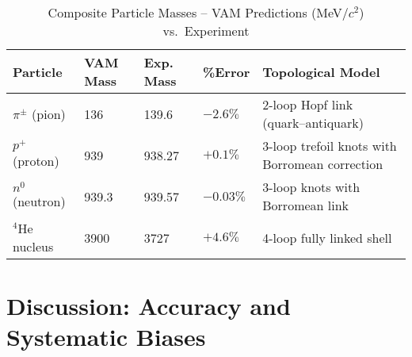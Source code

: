 \begin{table}[h!]
    \centering
    \begin{tabular}{lllll}
        \toprule
        \textbf{Particle} & \textbf{VAM Mass} & \textbf{Exp. Mass} & \textbf{\%Error} & \textbf{Topological Model} \\
        \midrule
        $\pi^{\pm}$ (pion) & 136 & 139.6 & $-2.6\%$ & 2-loop Hopf link (quark–antiquark) \\
        $p^+$ (proton) & 939 & 938.27 & $+0.1\%$ & 3-loop trefoil knots with Borromean correction \\
        $n^0$ (neutron) & 939.3 & 939.57 & $-0.03\%$ & 3-loop knots with Borromean link \\
        $^4$He nucleus & 3900 & 3727 & $+4.6\%$ & 4-loop fully linked shell \\
        \bottomrule
    \end{tabular}
    \caption{Composite Particle Masses – VAM Predictions (MeV/$c^2$) vs.\ Experiment}
    \label{tab:composites}
\end{table}

\section{Discussion: Accuracy and Systematic Biases}

